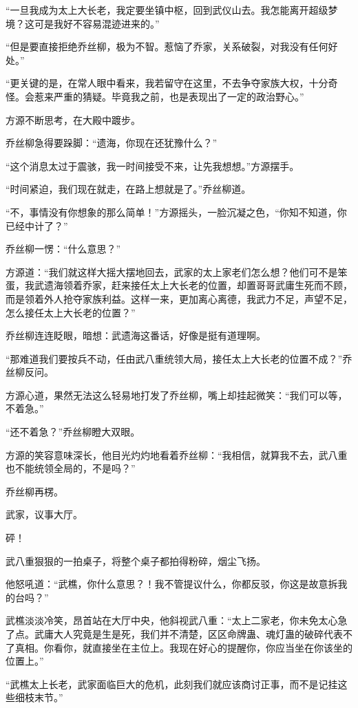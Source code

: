 \begin{this_body}
“一旦我成为太上大长老，我定要坐镇中枢，回到武仪山去。我怎能离开超级梦境？这可是我好不容易混迹进来的。”

“但是要直接拒绝乔丝柳，极为不智。惹恼了乔家，关系破裂，对我没有任何好处。”

“更关键的是，在常人眼中看来，我若留守在这里，不去争夺家族大权，十分奇怪。会惹来严重的猜疑。毕竟我之前，也是表现出了一定的政治野心。”

方源不断思考，在大殿中踱步。

乔丝柳急得要跺脚：“遗海，你现在还犹豫什么？”

“这个消息太过于震骇，我一时间接受不来，让先我想想。”方源摆手。

“时间紧迫，我们现在就走，在路上想就是了。”乔丝柳道。

“不，事情没有你想象的那么简单！”方源摇头，一脸沉凝之色，“你知不知道，你已经中计了？”

乔丝柳一愣：“什么意思？”

方源道：“我们就这样大摇大摆地回去，武家的太上家老们怎么想？他们可不是笨蛋，我武遗海领着乔家，赶来接任太上大长老的位置，却置哥哥武庸生死而不顾，而是领着外人抢夺家族利益。这样一来，更加离心离德，我武力不足，声望不足，怎么接任太上大长老的位置？”

乔丝柳连连眨眼，暗想：武遗海这番话，好像是挺有道理啊。

“那难道我们要按兵不动，任由武八重统领大局，接任太上大长老的位置不成？”乔丝柳反问。

方源心道，果然无法这么轻易地打发了乔丝柳，嘴上却挂起微笑：“我们可以等，不着急。”

“还不着急？”乔丝柳瞪大双眼。

方源的笑容意味深长，他目光灼灼地看着乔丝柳：“我相信，就算我不去，武八重也不能统领全局的，不是吗？”

乔丝柳再楞。

武家，议事大厅。

砰！

武八重狠狠的一拍桌子，将整个桌子都拍得粉碎，烟尘飞扬。

他怒吼道：“武樵，你什么意思？！我不管提议什么，你都反驳，你这是故意拆我的台吗？”

武樵淡淡冷笑，昂首站在大厅中央，他斜视武八重：“太上二家老，你未免太心急了点。武庸大人究竟是生是死，我们并不清楚，区区命牌蛊、魂灯蛊的破碎代表不了真相。你看你，就直接坐在主位上。我现在好心的提醒你，你应当坐在你该坐的位置上。”

“武樵太上长老，武家面临巨大的危机，此刻我们就应该商讨正事，而不是记挂这些细枝末节。”


\end{this_body}
